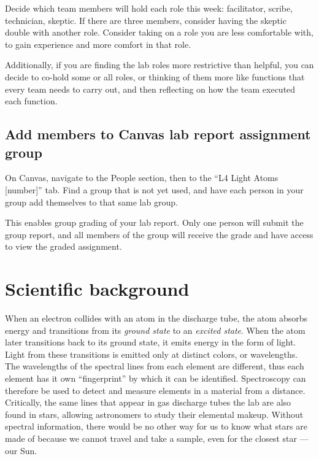 Decide which team members will hold each role this week: facilitator, scribe, technician, skeptic. If there are three members, consider having the skeptic double with another role. Consider taking on a role you are less comfortable with, to gain experience and more comfort in that role.

Additionally, if you are finding the lab roles more restrictive than helpful, you can decide to co-hold some or all roles, or thinking of them more like functions that every team needs to carry out, and then reflecting on how the team executed each function.

\subsection{Add members to Canvas lab report assignment group}

\begin{steps}
	\item On Canvas, navigate to the People section, then to the ``L4 Light Atoms [number]'' tab. Find a group that is not yet used, and have each person in your group add themselves to that same lab group.
\end{steps}

This enables group grading of your lab report. Only one person will submit the group report, and all members of the group will receive the grade and have access to view the graded assignment.

\section{Scientific background}

When an electron collides with an atom in the discharge tube, the atom absorbs energy and transitions from its \textit{ground state} to an \textit{excited state}.
When the atom later transitions back to its ground state, it emits energy in the form of light.
Light from these transitions is emitted only at distinct colors, or wavelengths.
The wavelengths of the spectral lines from each element are different, thus each element has it own ``fingerprint'' by which it can be identified.
Spectroscopy can therefore be used to detect and measure elements in a material from a distance.
Critically, the same lines that appear in gas discharge tubes the lab are also found in stars, allowing astronomers to study their elemental makeup.
Without spectral information, there would be no other way for us to know what stars are made of because we cannot travel and take a sample, even for the closest star --- our Sun.

